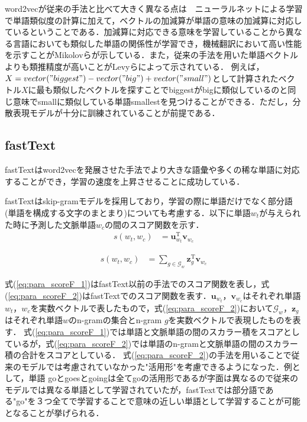 word2vecが従来の手法と比べて大きく異なる点は　ニューラルネットによる学習で単語類似度の計算に加えて，ベクトルの加減算が単語の意味の加減算に対応しているということである．加減算に対応できる意味を学習していることから異なる言語においても類似した単語の関係性が学習でき，機械翻訳において高い性能を示すことがMikolovら\cite{w2vTranslate}が示している．また，従来の手法を用いた単語ベクトルよりも類推精度が高いことがLevyら\cite{levy2014neural}によって示されている．
例えば，$X=vector("biggest") - vector("big") + vector("small")$として計算されたベクトル$X$に最も類似したベクトルを探すことでbiggestがbigに類似しているのと同じ意味でsmallに類似している単語smallestを見つけることができる．ただし，分散表現モデルが十分に訓練されていることが前提である．

\subsection{fastText}
fastText\cite{fastText}\cite{fastText2}はword2vecを発展させた手法でより大きな語彙や多くの稀な単語に対応することができ，学習の速度を上昇させることに成功している．

fastTextはskip-gramモデルを採用しており，学習の際に単語だけでなく部分語(単語を構成する文字のまとまり)についても考慮する．以下に単語$w_t$が与えられた時に予測した文脈単語$w_c$の間のスコア関数を示す．
\begin{equation}
\begin{aligned}
\label{eq:para_scoreF_1}
s(w_t , w_c) & = \bm{ u }^{\mathrm{T}}_{w_t} \bm{v}_{w_c}
\end{aligned}
\end{equation}

\begin{equation}
\begin{aligned}
\label{eq:para_scoreF_2}
s(w_t , w_c) & =  \sum_{g \in \mathcal{G}_w} \bm{ z }^{\mathrm{T}}_{g} \bm{v}_{w_c}
\end{aligned}
\end{equation}

式(\ref{eq:para_scoreF_1})はfastText以前の手法でのスコア関数を表し，式(\ref{eq:para_scoreF_2})はfastTextでのスコア関数を表す．$\bm{u}_{w_{t}}$，$\bm{v}_{w_c}$はそれぞれ単語$w_t$，$w_c$を実数ベクトルで表したもので，式(\ref{eq:para_scoreF_2})において$\mathcal{G}_w$，$\bm{z}_{g}$はそれぞれ単語$w$のn-gramの集合とn-gram $g$を実数ベクトルで表現したものを表す．
式(\ref{eq:para_scoreF_1})では単語と文脈単語の間のスカラー積をスコアとしているが，式(\ref{eq:para_scoreF_2})では単語のn-gramと文脈単語の間のスカラー積の合計をスコアとしている．
式(\ref{eq:para_scoreF_2})の手法を用いることで従来のモデルでは考慮されていなかった"活用形"を考慮できるようになった．例として，単語 goとgoesとgoingは全てgoの活用形であるが字面は異なるので従来のモデルでは異なる単語として学習されていたが，fastTextでは部分語である"go"を３つ全てで学習することで意味の近しい単語として学習することが可能となることが挙げられる．

